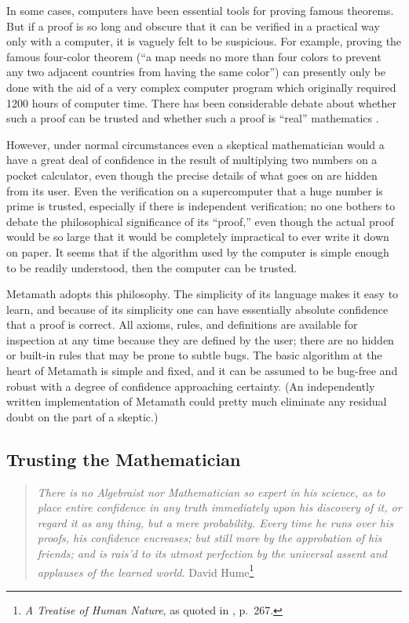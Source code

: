 In some cases, computers have been essential tools for proving famous
theorems.  But if a proof is so long and obscure that it can be verified in a
practical way only with a computer, it is vaguely felt to be suspicious.  For
example, proving the famous four-color theorem (``a map needs no more than four colors to
prevent any two adjacent countries from having the same color'') can presently
only be done with the aid of a very complex computer program which originally
required 1200 hours of computer time. There has been considerable debate about
whether such a proof can be trusted and whether such a proof is ``real''
mathematics \cite{Swart}.

However, under normal circumstances even a skeptical mathematician would a have
a great deal of confidence in the result of multiplying two numbers on a pocket
calculator, even though the precise details of what goes on are hidden from its
user.  Even the verification on a supercomputer that a huge number is prime is
trusted, especially if there is independent verification; no one bothers to
debate the philosophical significance of its ``proof,'' even though the actual
proof would be so large that it would be completely impractical to ever write
it down on paper.  It seems that if the algorithm used by the computer is
simple enough to be readily understood, then the computer can be trusted.

Metamath adopts this philosophy.  The simplicity of its
language makes it easy to learn, and because of its simplicity one can have
essentially absolute confidence that a proof is correct. All axioms, rules, and
definitions are available for inspection at any time because they are defined
by the user; there are no hidden or built-in rules that may be prone to subtle
bugs.  The basic algorithm at the heart of
Metamath is simple and fixed, and it can be assumed to be bug-free and robust
with a degree of confidence approaching certainty.  (An independently written
implementation of Metamath could pretty much eliminate any residual doubt on
the part of a skeptic.)

\subsection{Trusting the Mathematician}\label{trust}

\begin{quote}
  {\em There is no Algebraist nor Mathematician so expert in his science, as
  to place entire confidence in any truth immediately upon his discovery of it,
  or regard it as any thing, but a mere probability.  Every time he runs over
  his proofs, his confidence encreases; but still more by the approbation of
  his friends; and is rais'd to its utmost perfection by the universal assent
  and applauses of the learned world.}
  \flushright\sc David Hume\footnote{{\em A Treatise of Human Nature}, as
  quoted in \cite{deMillo}, p.~267.}\\
\end{quote}

